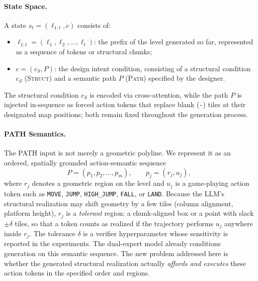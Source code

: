 \documentclass[11pt,a4paper]{article}
\begin{document}
\paragraph{State Space.}
A state \( s_t = (\ell_{1:t}, c) \) consists of:
\begin{itemize}
    \item \(\ell_{1:t} = (\ell_1, \ell_2, \ldots, \ell_t)\): the prefix of the level generated so far, represented as a sequence of tokens or structural chunks;
    \item \(c=(c_S,P)\): the design intent condition, consisting of a structural condition \(c_S\) (\textsc{Struct}) and a semantic path \(P\) (\textsc{Path}) specified by the designer.
\end{itemize}
The structural condition \(c_S\) is encoded via cross-attention, while the path \(P\) is injected in-sequence as forced action tokens that replace blank (\texttt{-}) tiles at their designated map positions; both remain fixed throughout the generation process.

\paragraph{PATH Semantics.}
The PATH input is not merely a geometric polyline. We represent it as an ordered, spatially grounded action-semantic sequence
\begin{equation}
    P=(p_1,p_2,\ldots,p_m), \qquad p_j=(r_j,u_j),
    \label{eq:path_semantics}
\end{equation}
where \(r_j\) denotes a geometric region on the level and \(u_j\) is a game-playing action token such as \texttt{MOVE}, \texttt{JUMP}, \texttt{HIGH\_JUMP}, \texttt{FALL}, or \texttt{LAND}. Because the LLM's structural realization may shift geometry by a few tiles (column alignment, platform height), \(r_j\) is a \emph{tolerant} region: a chunk-aligned box or a point with slack \(\pm\delta\) tiles, so that a token counts as realized if the trajectory performs \(u_j\) anywhere inside \(r_j\). The tolerance \(\delta\) is a verifier hyperparameter whose sensitivity is reported in the experiments. The dual-expert model already conditions generation on this semantic sequence. The new problem addressed here is whether the generated structural realization actually \emph{affords and executes} these action tokens in the specified order and regions.
\end{document}
